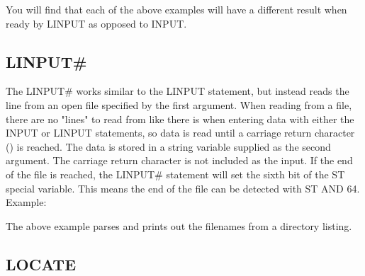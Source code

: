 \vspace{16pt}

You will find that each of the above examples will have a different result when
ready by {\ttfamily LINPUT} as opposed to {\ttfamily INPUT}.\\

\subsection{LINPUT\#}

The {\ttfamily LINPUT\#} works similar to the {\ttfamily LINPUT} statement, but
instead reads the line from an open file specified by the first argument.  When
reading from a file, there are no "lines" to read from like there is when
entering data with either the {\ttfamily INPUT} or {\ttfamily LINPUT}
statements, so data is read until a carriage return character ({})
is reached.  The data is stored in a string variable supplied as the second
argument.  The carriage return character is not included as the input.  If the
end of the file is reached, the {\ttfamily LINPUT\#} statement will set the
sixth bit of the {\ttfamily ST} special variable.  This means the end of the
file can be detected with {\ttfamily ST AND 64}.\\

Example:\\


The above example parses and prints out the filenames from a directory
listing.\\

\subsection{LOCATE}

